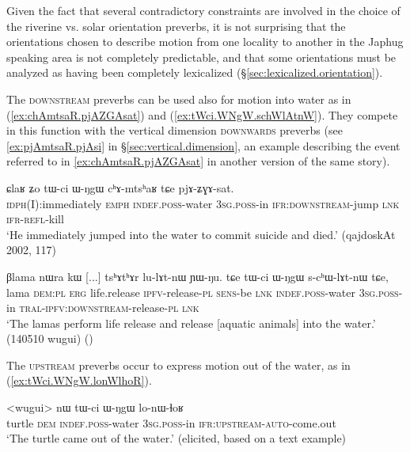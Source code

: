 Given the fact that several contradictory constraints are involved in the choice of the riverine vs. solar orientation preverbs, it is not surprising that the orientations chosen to describe motion from one locality to another in the Japhug speaking area is not completely predictable, and that some orientations must be analyzed as having been completely lexicalized (§\ref{sec:lexicalized.orientation}).

The \textsc{downstream} preverbs can be used also for motion into water as in (\ref{ex:chAmtsaR.pjAZGAsat}) and (\ref{ex:tWci.WNgW.schWlAtnW}). They compete in this function with the vertical dimension \textsc{downwards} preverbs (see \ref{ex:pjAmtsaR.pjAsi} in §\ref{sec:vertical.dimension}, an example describing the event referred to in \ref{ex:chAmtsaR.pjAZGAsat} in another version of the same story).
 
 \begin{exe}
\ex \label{ex:chAmtsaR.pjAZGAsat}
\gll ɕlaʁ ʑo tɯ-ci ɯ-ŋgɯ cʰɤ-mtsʰaʁ tɕe pjɤ-ʑɣɤ-sat. \\
\textsc{idph}(I):immediately \textsc{emph} \textsc{indef}.\textsc{poss}-water \textsc{3sg}.\textsc{poss}-in \textsc{ifr}:\textsc{downstream}-jump \textsc{lnk} \textsc{ifr}-\textsc{refl}-kill \\
\glt `He immediately jumped into the water to commit suicide and died.' (qajdoskAt 2002, 117)
\end{exe}

\begin{exe}
\ex \label{ex:tWci.WNgW.schWlAtnW}
\gll  βlama nɯra kɯ [...] tsʰɤtʰɤr lu-lɤt-nɯ ɲɯ-ŋu.  tɕe tɯ-ci ɯ-ŋgɯ s-cʰɯ-lɤt-nɯ tɕe,  \\
 lama \textsc{dem}:\textsc{pl} \textsc{erg} { } life.release \textsc{ipfv}-release-\textsc{pl} \textsc{sens}-be \textsc{lnk} \textsc{indef}.\textsc{poss}-water \textsc{3sg}.\textsc{poss}-in \textsc{tral}-\textsc{ipfv}:\textsc{downstream}-release-\textsc{pl} \textsc{lnk}  \\
\glt `The lamas perform life release and release [aquatic animals] into the water.' (140510 wugui) 	()
\end{exe}

The \textsc{upstream} preverbs occur to express motion out of the water, as in (\ref{ex:tWci.WNgW.lonWlhoR}).

\begin{exe}
\ex \label{ex:tWci.WNgW.lonWlhoR}
\gll <wugui> nɯ tɯ-ci ɯ-ŋgɯ lo-nɯ-ɬoʁ  \\
turtle \textsc{dem} \textsc{indef}.\textsc{poss}-water \textsc{3sg}.\textsc{poss}-in \textsc{ifr}:\textsc{upstream}-\textsc{auto}-come.out \\
\glt `The turtle came out of the water.' (elicited, based on a text example)
\end{exe}

